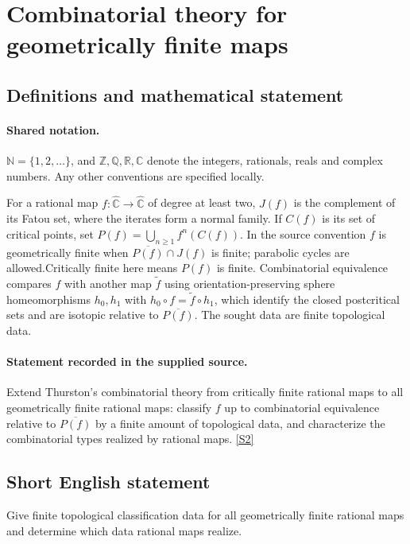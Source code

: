 \documentclass[11pt]{article}
\newcommand{\sref}[2]{\hyperlink{source:#1:#2}{[S#2]}}
\begin{document}
\section{Combinatorial theory for geometrically finite maps}\label{statement}

\subsection{Definitions and mathematical statement}

\paragraph{Shared notation.}$\mathbb N=\{1,2,\ldots\}$, and $\mathbb Z,\mathbb Q,\mathbb R,\mathbb C$ denote the integers, rationals, reals and complex numbers. Any other conventions are specified locally.


For a rational map $f:\widehat{\mathbb C}\to\widehat{\mathbb C}$ of degree at least two, $J(f)$ is the complement of its Fatou set, where the iterates form a normal family. If $C(f)$ is its set of critical points, set $P(f)=\bigcup_{n\geq1}f^n(C(f))$. In the source convention $f$ is geometrically finite when $\overline{P(f)}\cap J(f)$ is finite; parabolic cycles are allowed.Critically finite here means $P(f)$ is finite. Combinatorial equivalence compares $f$ with another map $\widetilde f$ using orientation-preserving sphere homeomorphisms $h_0,h_1$ with $h_0\circ f=\widetilde f\circ h_1$, which identify the closed postcritical sets and are isotopic relative to $\overline{P(f)}$. The sought data are finite topological data.
\paragraph{Statement recorded in the supplied source.}
Extend Thurston’s combinatorial theory from critically finite rational maps to all geometrically finite rational maps: classify $f$ up to combinatorial equivalence relative to $\overline{P(f)}$ by a finite amount of topological data, and characterize the combinatorial types realized by rational maps. \sref{statement}{2}
\subsection{Short English statement}
Give finite topological classification data for all geometrically finite rational maps and determine which data rational maps realize.
\end{document}
